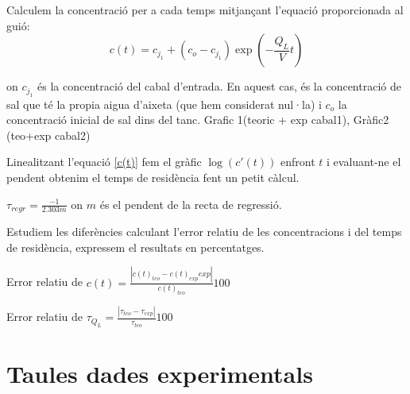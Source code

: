 \documentclass[10pt, twoside]{article}
\begin{document}
Calculem la concentració per a cada temps mitjançant l'equació proporcionada al guió:
\begin{equation}
    c(t) = c_{j_1} + (c_o-c_{j_1})\exp\left(-\frac{Q_L}{V}t\right) 
    \label{c(t)}   
\end{equation}

on $c_{j_1}$ és la concentració del cabal d'entrada. En aquest cas, és la concentració de sal que té la propia aigua d'aixeta (que hem considerat nul·la) i $c_o$ la concentració inicial de sal dins del tanc.
Grafic 1(teoric + exp cabal1), Gràfic2 (teo+exp cabal2)

Linealitzant l'equació \eqref{c(t)} fem el gràfic $\log(c'(t))$ enfront $t$ i evaluant-ne el pendent obtenim el temps de residència fent un petit càlcul.

$\tau_{regr} = \frac{-1}{2.303m}$ on $m$ és el pendent de la recta de regressió.

Estudiem les diferències calculant l'error relatiu de les concentracions i del temps de residència, expressem el resultats en percentatges.

Error  relatiu  de  $c(t) = \frac{|c(t)_{teo} - c(t)_{exp} exp|}{c(t)_{teo}} 100$

Error relatiu de $\tau_{Q_L} = \frac{|\tau_{teo} - \tau_{exp}|}{\tau_{teo}} 100$

\section{Taules dades experimentals}
\end{document}
